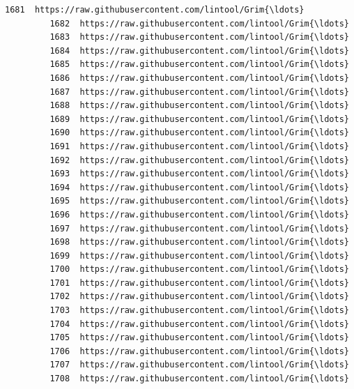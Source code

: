 \documentclass[11pt]{article}
\begin{document}
\begin{Verbatim}[commandchars=\\\{\}]
         1681  https://raw.githubusercontent.com/lintool/Grim{\ldots}   
         1682  https://raw.githubusercontent.com/lintool/Grim{\ldots}   
         1683  https://raw.githubusercontent.com/lintool/Grim{\ldots}   
         1684  https://raw.githubusercontent.com/lintool/Grim{\ldots}   
         1685  https://raw.githubusercontent.com/lintool/Grim{\ldots}   
         1686  https://raw.githubusercontent.com/lintool/Grim{\ldots}   
         1687  https://raw.githubusercontent.com/lintool/Grim{\ldots}   
         1688  https://raw.githubusercontent.com/lintool/Grim{\ldots}   
         1689  https://raw.githubusercontent.com/lintool/Grim{\ldots}   
         1690  https://raw.githubusercontent.com/lintool/Grim{\ldots}   
         1691  https://raw.githubusercontent.com/lintool/Grim{\ldots}   
         1692  https://raw.githubusercontent.com/lintool/Grim{\ldots}   
         1693  https://raw.githubusercontent.com/lintool/Grim{\ldots}   
         1694  https://raw.githubusercontent.com/lintool/Grim{\ldots}   
         1695  https://raw.githubusercontent.com/lintool/Grim{\ldots}   
         1696  https://raw.githubusercontent.com/lintool/Grim{\ldots}   
         1697  https://raw.githubusercontent.com/lintool/Grim{\ldots}   
         1698  https://raw.githubusercontent.com/lintool/Grim{\ldots}   
         1699  https://raw.githubusercontent.com/lintool/Grim{\ldots}   
         1700  https://raw.githubusercontent.com/lintool/Grim{\ldots}   
         1701  https://raw.githubusercontent.com/lintool/Grim{\ldots}   
         1702  https://raw.githubusercontent.com/lintool/Grim{\ldots}   
         1703  https://raw.githubusercontent.com/lintool/Grim{\ldots}   
         1704  https://raw.githubusercontent.com/lintool/Grim{\ldots}   
         1705  https://raw.githubusercontent.com/lintool/Grim{\ldots}   
         1706  https://raw.githubusercontent.com/lintool/Grim{\ldots}   
         1707  https://raw.githubusercontent.com/lintool/Grim{\ldots}   
         1708  https://raw.githubusercontent.com/lintool/Grim{\ldots}   
         

\end{Verbatim}
\end{document}
